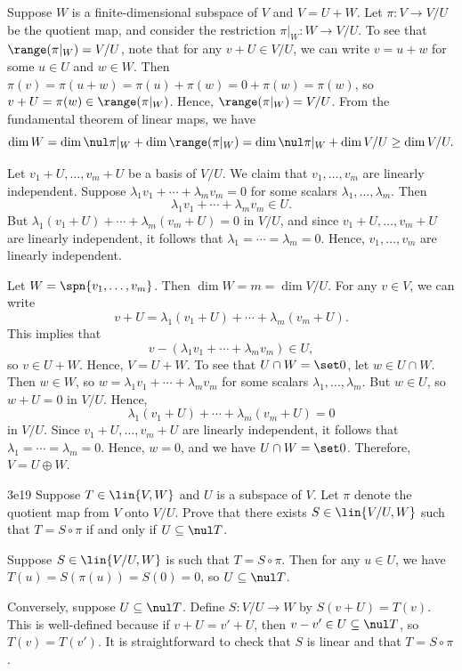 \begin{solenum}
    \item Suppose $W$ is a finite-dimensional subspace of $V$ and $V = U + W$.
	Let $\pi: V \to V / U$ be the quotient map, and consider the restriction $\pi|_W : W \to V / U$.
	To see that $\range(\pi|_W) = V / U$, note that for any $v + U \in V / U$, we can write $v = u + w$ for some $u \in U$ and $w \in W$.
	Then $\pi(v) = \pi(u + w) = \pi(u) + \pi(w) = 0 + \pi(w) = \pi(w)$, so $v + U = \pi(w) \in \range(\pi|_W)$.
	Hence, $\range(\pi|_W) = V / U$.
	From the fundamental theorem of linear maps, we have
    \[
    	\dim W = \dim \nul \pi|_W + \dim \range(\pi|_W) = \dim \nul \pi|_W + \dim V / U \geq \dim V / U.
    \]
    \item Let $v_1 + U, \ldots, v_m + U$ be a basis of $V / U$.
	We claim that $v_1, \ldots, v_m$ are linearly independent.
	Suppose $\lambda_1 v_1 + \cdots + \lambda_m v_m = 0$ for some scalars $\lambda_1, \ldots, \lambda_m$.
	Then
    \[
    	\lambda_1 v_1 + \cdots + \lambda_m v_m \in U.
    \]
    But $\lambda_1 (v_1 + U) + \cdots + \lambda_m (v_m + U) = 0$ in $V / U$, and since $v_1 + U, \ldots, v_m + U$ are linearly independent, it follows that $\lambda_1 = \cdots = \lambda_m = 0$.
	Hence, $v_1, \ldots, v_m$ are linearly independent.

    Let $W = \spn\{v_1, \ldots, v_m\}$.
	Then $\dim W = m = \dim V / U$.
	For any $v \in V$, we can write
    \[
    	v + U = \lambda_1(v_1 + U) + \cdots + \lambda_m(v_m + U).
    \]
    This implies that 
    \[
    	v - (\lambda_1 v_1 + \cdots + \lambda_m v_m) \in U,
    \]
    so $v \in U + W$.
	Hence, $V = U + W$.
	To see that $U \cap W = \set 0$, let $w \in U \cap W$.
	Then $w \in W$, so $w = \lambda_1 v_1 + \cdots + \lambda_m v_m$ for some scalars $\lambda_1, \ldots, \lambda_m$.
	But $w \in U$, so $w + U = 0$ in $V / U$.
	Hence,
    \[
    	\lambda_1 (v_1 + U) + \cdots + \lambda_m (v_m + U) = 0
    \]
    in $V / U$.
	Since $v_1 + U, \ldots, v_m + U$ are linearly independent, it follows that $\lambda_1 = \cdots = \lambda_m = 0$.
	Hence, $w = 0$, and we have $U \cap W = \set 0$.
	Therefore, $V = U \oplus W$.
\end{solenum}

\begin{exercise}{3e19}
    Suppose $T \in \lin{V, W}$ and $U$ is a subspace of $V$.
	Let $\pi$ denote the quotient map from $V$ onto $V / U$.
	Prove that there exists $S \in \lin{V / U, W}$ such that $T = S \circ \pi$ if and only if $U \subseteq \nul T$.
\end{exercise}

\begin{sol}
    Suppose $S \in \lin{V / U, W}$ is such that $T = S \circ \pi$.
	Then for any $u \in U$, we have $T(u) = S(\pi(u)) = S(0) = 0$, so $U \subseteq \nul T$.

    Conversely, suppose $U \subseteq \nul T$.
	Define $S: V / U \to W$ by $S(v + U) = T(v)$.
	This is well-defined because if $v + U = v' + U$, then $v - v' \in U \subseteq \nul T$, so $T(v) = T(v')$.
	It is straightforward to check that $S$ is linear and that $T = S \circ \pi$.
\end{sol}